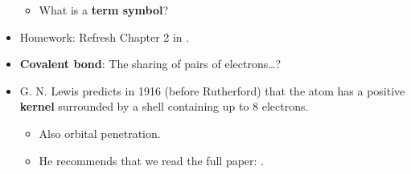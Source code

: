 \documentclass[../main.tex]{subfiles}
\begin{document}
\begin{itemize}
\begin{itemize}
        \item What is a \textbf{term symbol}?
    \end{itemize}
    \item Homework: Refresh Chapter 2 in \textcite{bib:MiesslerFischerTarr}.
    \item \textbf{Covalent bond}: The sharing of pairs of electrons\dots?
    \item G. N. Lewis predicts in 1916 (before Rutherford) that the atom has a positive \textbf{kernel} surrounded by a shell containing up to 8 electrons.
    \begin{itemize}
        \item Also orbital penetration.
        \item He recommends that we read the full paper: \textcite{bib:Lewis}.
    \end{itemize}
\end{itemize}
\end{document}

